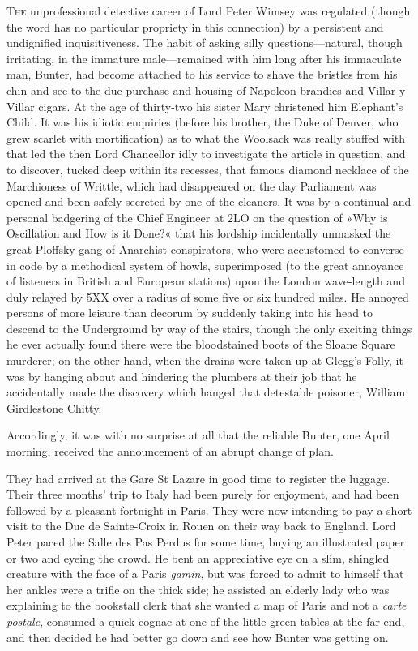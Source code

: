 	
\lettrine[lines=4]{T}{he} unprofessional detective career of Lord Peter Wimsey was regulated (though the word has no particular propriety in this connection) by a persistent and undignified inquisitiveness. The habit of asking silly questions—natural, though irritating, in the immature male—remained with him long after his immaculate man, Bunter, had become attached to his service to shave the bristles from his chin and see to the due purchase and housing of Napoleon brandies and Villar y Villar cigars. At the age of thirty-two his sister Mary christened him Elephant's Child. It was his idiotic enquiries (before his brother, the Duke of Denver, who grew scarlet with mortification) as to what the Woolsack was really stuffed with that led the then Lord Chancellor idly to investigate the article in question, and to discover, tucked deep within its recesses, that famous diamond necklace of the Marchioness of Writtle, which had disappeared on the day Parliament was opened and been safely secreted by one of the cleaners. It was by a continual and personal badgering of the Chief Engineer at 2LO on the question of »Why is Oscillation and How is it Done?« that his lordship incidentally unmasked the great Ploffsky gang of Anarchist conspirators, who were accustomed to converse in code by a methodical system of howls, superimposed (to the great annoyance of listeners in British and European stations) upon the London wave-length and duly relayed by 5XX over a radius of some five or six hundred miles. He annoyed persons of more leisure than decorum by suddenly taking into his head to descend to the Underground by way of the stairs, though the only exciting things he ever actually found there were the bloodstained boots of the Sloane Square murderer; on the other hand, when the drains were taken up at Glegg's Folly, it was by hanging about and hindering the plumbers at their job that he accidentally made the discovery which hanged that detestable poisoner, William Girdlestone Chitty.

Accordingly, it was with no surprise at all that the reliable Bunter, one April morning, received the announcement of an abrupt change of plan.

They had arrived at the Gare St Lazare in good time to register the luggage. Their three months' trip to Italy had been purely for enjoyment, and had been followed by a pleasant fortnight in Paris. They were now intending to pay a short visit to the Duc de Sainte-Croix in Rouen on their way back to England. Lord Peter paced the Salle des Pas Perdus for some time, buying an illustrated paper or two and eyeing the crowd. He bent an appreciative eye on a slim, shingled creature with the face of a Paris \textit{gamin}, but was forced to admit to himself that her ankles were a trifle on the thick side; he assisted an elderly lady who was explaining to the bookstall clerk that she wanted a map of Paris and not a \textit{carte postale}, consumed a quick cognac at one of the little green tables at the far end, and then decided he had better go down and see how Bunter was getting on.

